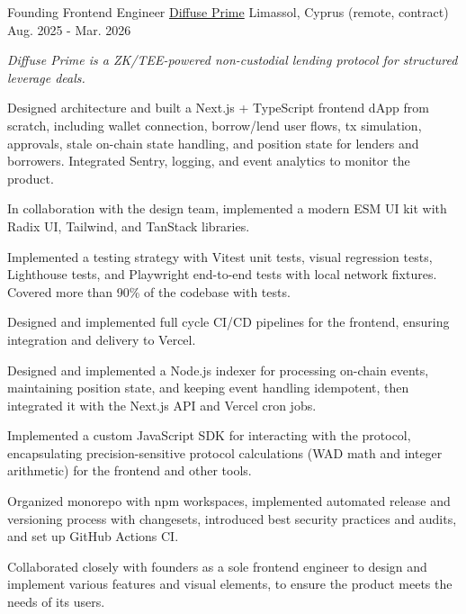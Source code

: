 \begin{cventries}
  \cventry
    {Founding Frontend Engineer} %
    {\href{https://prime.diffuse.fi/}{Diffuse Prime}} %
    {Limassol, Cyprus (remote, contract)} %
    {Aug. 2025 - Mar. 2026} %
    {
      \begin{cvitems} %
      \vspace{8pt}
      \item[] {\small\textit{Diffuse Prime is a ZK/TEE-powered non-custodial lending protocol for structured leverage deals.}}
      \vspace{8pt}
        \item {Designed architecture and built a Next.js + TypeScript frontend dApp from scratch, including wallet connection, borrow/lend user flows, tx simulation, approvals, stale on-chain state handling, and position state for lenders and borrowers. Integrated Sentry, logging, and event analytics to monitor the product.}
        \item {In collaboration with the design team, implemented a modern ESM UI kit with Radix UI, Tailwind, and TanStack libraries.}
        \item {Implemented a testing strategy with Vitest unit tests, visual regression tests, Lighthouse tests, and Playwright end-to-end tests with local network fixtures. Covered more than 90\% of the codebase with tests.}
        \item {Designed and implemented full cycle CI/CD pipelines for the frontend, ensuring integration and delivery to Vercel.}
        \item {Designed and implemented a Node.js indexer for processing on-chain events, maintaining position state, and keeping event handling idempotent, then integrated it with the Next.js API and Vercel cron jobs.}
        \item {Implemented a custom JavaScript SDK for interacting with the protocol, encapsulating precision-sensitive protocol calculations (WAD math and integer arithmetic) for the frontend and other tools.}
        \item {Organized monorepo with npm workspaces, implemented automated release and versioning process with changesets, introduced best security practices and audits, and set up GitHub Actions CI.}
        \item {Collaborated closely with founders as a sole frontend engineer to design and implement various features and visual elements, to ensure the product meets the needs of its users.}
      \end{cvitems}
    }
    {\vspace{24pt}}


\end{cventries}

